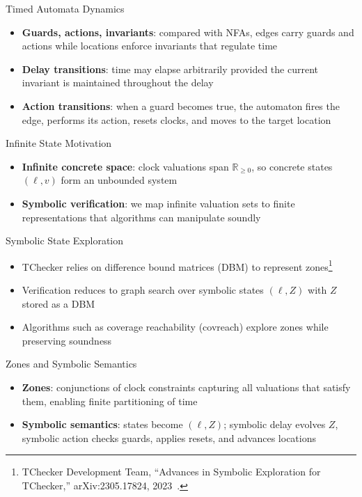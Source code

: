 \documentclass{beamer}
\begin{document}
\begin{frame}{Timed Automata Dynamics}
  \begin{itemize}
    \item \textbf{Guards, actions, invariants}: compared with NFAs, edges carry guards and actions while locations enforce invariants that regulate time
    \item \textbf{Delay transitions}: time may elapse arbitrarily provided the current invariant is maintained throughout the delay
    \item \textbf{Action transitions}: when a guard becomes true, the automaton fires the edge, performs its action, resets clocks, and moves to the target location
  \end{itemize}
\end{frame}

\begin{frame}{Infinite State Motivation}
  \begin{itemize}
    \item \textbf{Infinite concrete space}: clock valuations span \(\mathbb{R}_{\ge 0}\), so concrete states \((\ell, v)\) form an unbounded system
    \item \textbf{Symbolic verification}: we map infinite valuation sets to finite representations that algorithms can manipulate soundly
  \end{itemize}
\end{frame}

\begin{frame}{Symbolic State Exploration}
  \begin{itemize}
    \item TChecker relies on difference bound matrices (DBM) to represent zones\footnote{\tiny TChecker Development Team, ``Advances in Symbolic Exploration for TChecker,'' arXiv:2305.17824, 2023~\cite{herbreteau2023tchecker}.}
    \item Verification reduces to graph search over symbolic states \((\ell, Z)\) with \(Z\) stored as a DBM
    \item Algorithms such as coverage reachability (covreach) explore zones while preserving soundness
  \end{itemize}
\end{frame}

\begin{frame}{Zones and Symbolic Semantics}
  \begin{itemize}
    \item \textbf{Zones}: conjunctions of clock constraints capturing all valuations that satisfy them, enabling finite partitioning of time
    \item \textbf{Symbolic semantics}: states become \((\ell, Z)\); symbolic delay evolves \(Z\), symbolic action checks guards, applies resets, and advances locations
  \end{itemize}
\end{frame}
\end{document}
